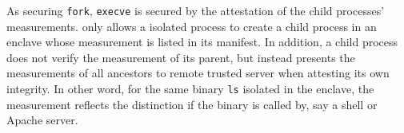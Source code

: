 As securing {\tt fork}, {\tt execve} is secured by the attestation of
the child processes' measurements.
\graphenesgx{} only allows a isolated process to create a child process
in an enclave whose measurement is listed in its manifest.
In addition, a child process does not verify the measurement of its parent,
but instead presents the measurements of all ancestors
to remote trusted server when attesting its own integrity.
In other word, for the same binary {\tt ls} isolated in the enclave,
the measurement reflects the distinction if the binary is called by,
say a shell or Apache server.


%
%



